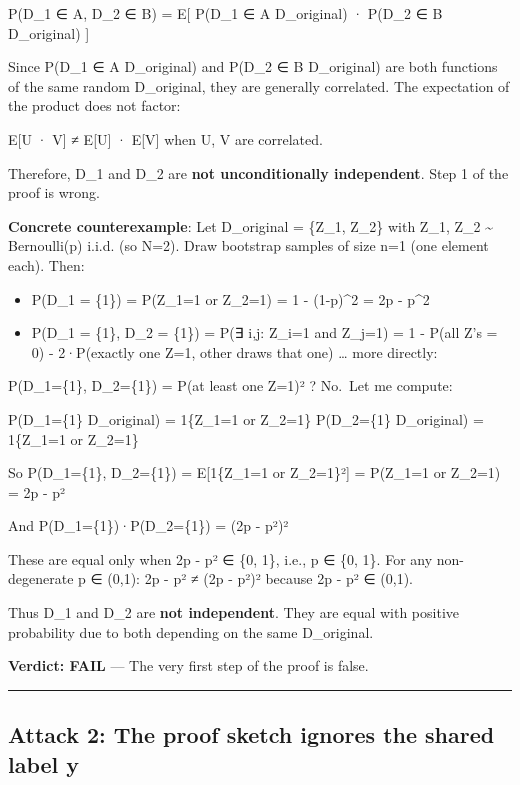 \documentclass[
  12pt,
]{ctexart}
\providecommand{\tightlist}{%
  \setlength{\itemsep}{0pt}\setlength{\parskip}{0pt}}
\begin{document}
P(D\_1 ∈ A, D\_2 ∈ B) = E{[} P(D\_1 ∈ A \textbar{} D\_original) · P(D\_2
∈ B \textbar{} D\_original) {]}

Since P(D\_1 ∈ A \textbar{} D\_original) and P(D\_2 ∈ B \textbar{}
D\_original) are both functions of the same random D\_original, they are
generally correlated. The expectation of the product does not factor:

E{[}U · V{]} ≠ E{[}U{]} · E{[}V{]} when U, V are correlated.

Therefore, D\_1 and D\_2 are \textbf{not unconditionally independent}.
Step 1 of the proof is wrong.

\textbf{Concrete counterexample}: Let D\_original = \{Z\_1, Z\_2\} with
Z\_1, Z\_2 \textasciitilde{} Bernoulli(p) i.i.d. (so N=2). Draw
bootstrap samples of size n=1 (one element each). Then:

\begin{itemize}
\tightlist
\item
  P(D\_1 = \{1\}) = P(Z\_1=1 or Z\_2=1) = 1 - (1-p)\^{}2 = 2p - p\^{}2
\item
  P(D\_1 = \{1\}, D\_2 = \{1\}) = P(∃ i,j: Z\_i=1 and Z\_j=1) = 1 -
  P(all Z's = 0) - 2·P(exactly one Z=1, other draws that one) \ldots{}
  more directly:
\end{itemize}

P(D\_1=\{1\}, D\_2=\{1\}) = P(at least one Z=1)² ? No.~Let me compute:

P(D\_1=\{1\} \textbar{} D\_original) = 1\{Z\_1=1 or Z\_2=1\}
P(D\_2=\{1\} \textbar{} D\_original) = 1\{Z\_1=1 or Z\_2=1\}

So P(D\_1=\{1\}, D\_2=\{1\}) = E{[}1\{Z\_1=1 or Z\_2=1\}²{]} = P(Z\_1=1
or Z\_2=1) = 2p - p²

And P(D\_1=\{1\})·P(D\_2=\{1\}) = (2p - p²)²

These are equal only when 2p - p² ∈ \{0, 1\}, i.e., p ∈ \{0, 1\}. For
any non-degenerate p ∈ (0,1): 2p - p² ≠ (2p - p²)² because 2p - p² ∈
(0,1).

Thus D\_1 and D\_2 are \textbf{not independent}. They are equal with
positive probability due to both depending on the same D\_original.

\textbf{Verdict: FAIL} --- The very first step of the proof is false.

\begin{center}\rule{0.5\linewidth}{0.5pt}\end{center}

\subsection{Attack 2: The proof sketch ignores the shared label
y}\label{attack-2-the-proof-sketch-ignores-the-shared-label-y}
\end{document}

